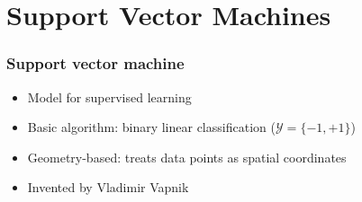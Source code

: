 \documentclass[10pt]{beamer}
\begin{document}

\section{Support Vector Machines}

\begin{frame}
  \frametitle{Support vector machine}
  \begin{itemize}
    \item Model for supervised learning
	\item Basic algorithm: binary linear classification ($\mathcal{Y}=\{-1,+1\}$)
	\item Geometry-based: treats data points as spatial coordinates
	\item Invented by Vladimir Vapnik
  \end{itemize}
\end{frame}
\end{document}
